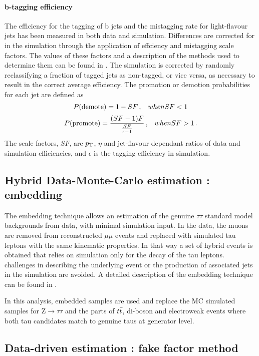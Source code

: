 \paragraph{b-tagging efficiency} The efficiency for the tagging of b jets and the mistagging rate for light-flavour jets has been measured in both data and simulation. Differences are corrected for in the simulation through the application of effciency and mistagging scale factors. The values of these factors and a description of the methods used to determine them can be found in \cite{Sirunyan_2018}. The simulation is corrected by randomly reclassifying a fraction of tagged jets as non-tagged, or vice versa, as necessary to result in the correct average efficiency. The promotion or demotion probabilities for each jet are defined as
\begin{equation*}
    P(\mathrm{demote}) = 1 - SF \msep when SF < 1
\end{equation*}
\begin{equation*}
    P(\mathrm{promote}) = \frac{(SF-1)F}{\frac{SF}{\epsilon-1}} \msep when SF > 1 \mend
\end{equation*}
The scale factors, $SF$, are $p_{\mathrm{T}}$, $\eta$ and jet-flavour dependant ratios of data and simulation efficiencies, and $\epsilon$ is the tagging efficiency in simulation.

\subsection{Hybrid Data-Monte-Carlo estimation : embedding}

The embedding technique allows an estimation of the genuine $\tau\tau$ standard model backgrounds from data, with minimal simulation input. In the data, the muons are removed from reconstructed $\mu\mu$ events and replaced with simulated tau leptons with the same kinematic properties. In that way a set of hybrid events is obtained that relies on simulation only for the decay of the tau leptons. challenges in describing the underlying event or the production of associated jets in the simulation are avoided. A detailed description of the embedding technique can be found in \cite{CMS:2018apv}.

In this analysis, embedded samples are used and replace the MC simulated samples for $\mathrm{Z}\rightarrow \tau\tau$ and the parts of $t\Bar{t}$, di-boson and electroweak events where both tau candidates match to genuine taus at generator level.

\subsection{Data-driven estimation : fake factor method}

